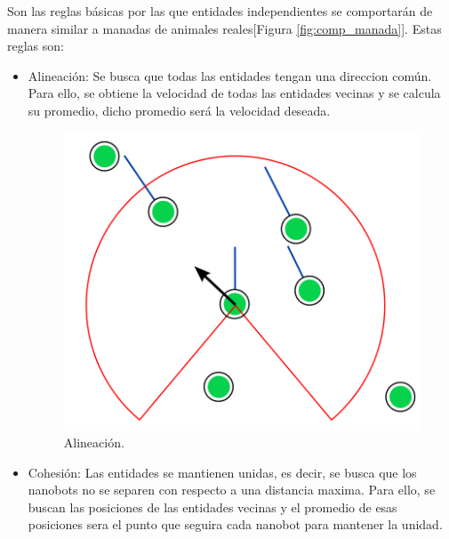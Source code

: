 Son las reglas básicas por las que entidades independientes se comportarán de manera similar a manadas de animales reales[Figura \ref{fig:comp_manada}]. Estas reglas son:
\begin{itemize}
 \item Alineación: Se busca que todas las entidades tengan una direccion común. Para ello, se obtiene la velocidad de todas las entidades vecinas y se calcula su promedio, dicho promedio será la velocidad deseada.
 
  \begin{figure}[h]
 \centering
 \includegraphics[scale=0.2]{../images/alineacion.png}
 \caption{Alineación.}
 \label{fig:../images/flee.png}
 \end{figure}
 
 \item Cohesión: Las entidades se mantienen unidas, es decir, se busca que los nanobots no se separen con respecto a una distancia maxima. Para ello, se buscan las posiciones de las entidades vecinas y el promedio de esas posiciones sera el punto que seguira cada nanobot para mantener la unidad.
 

\end{itemize}
